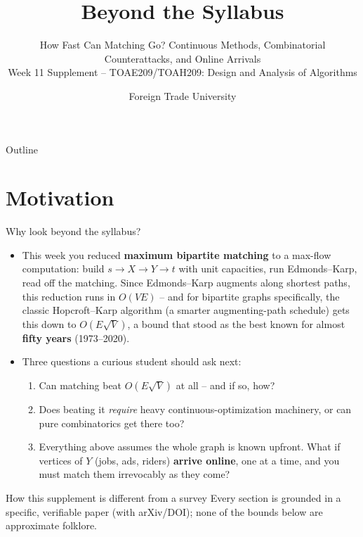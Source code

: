 \documentclass[11pt,aspectratio=169]{beamer}
\title{Beyond the Syllabus}
\subtitle{How Fast Can Matching Go? Continuous Methods, Combinatorial Counterattacks,
and Online Arrivals\\
\small Week 11 Supplement -- TOAE209/TOAH209: Design and Analysis of Algorithms}
\author{Foreign Trade University}
\date{}
\begin{document}
\begin{frame}
  \titlepage
\end{frame}

\begin{frame}{Outline}
  \tableofcontents
\end{frame}

\section{Motivation}

\begin{frame}{Why look beyond the syllabus?}
  \small
  \begin{itemize}
    \item This week you reduced \textbf{maximum bipartite matching} to a max-flow
    computation: build $s\to X \to Y \to t$ with unit capacities, run Edmonds--Karp,
    read off the matching. Since Edmonds--Karp augments along shortest paths, this
    reduction runs in $O(VE)$ -- and for bipartite graphs specifically, the classic
    Hopcroft--Karp algorithm (a smarter augmenting-path schedule) gets this down to
    $O(E\sqrt{V})$, a bound that stood as the best known for almost \textbf{fifty years}
    (1973--2020).
    \item Three questions a curious student should ask next:
    \begin{enumerate}
      \item Can matching beat $O(E\sqrt{V})$ at all -- and if so, how?
      \item Does beating it \emph{require} heavy continuous-optimization machinery, or
      can pure combinatorics get there too?
      \item Everything above assumes the whole graph is known upfront. What if vertices
      of $Y$ (jobs, ads, riders) \textbf{arrive online}, one at a time, and you must
      match them irrevocably as they come?
    \end{enumerate}
  \end{itemize}
  \begin{alertblock}{How this supplement is different from a survey}
    Every section is grounded in a specific, verifiable paper (with arXiv/DOI); none of
    the bounds below are approximate folklore.
  \end{alertblock}
\end{frame}
\end{document}
